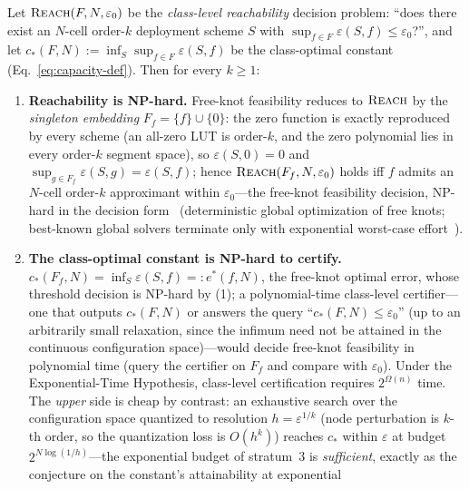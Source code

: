 \vspace{4pt}
\begin{theorem}
\label{thm:stratum3-transfer}
Let $\textsc{Reach}(F, N, \varepsilon_0)$ be the \emph{class-level
reachability} decision problem: ``does there exist an $N$-cell
order-$k$ deployment scheme $S$ with $\sup_{f \in F} \varepsilon(S, f)
\leq \varepsilon_0$?'', and let $c_*(F, N) := \inf_S \sup_{f \in F}
\varepsilon(S, f)$ be the class-optimal constant
(Eq.~\eqref{eq:capacity-def}). Then for every $k \geq 1$:
\begin{enumerate}
    \item \textbf{Reachability is NP-hard.} Free-knot feasibility
    reduces to $\textsc{Reach}$ by the \emph{singleton embedding}
    $F_f = \{f\} \cup \{0\}$: the zero function is exactly reproduced
    by every scheme (an all-zero LUT is order-$k$, and the zero
    polynomial lies in every order-$k$ segment space), so
    $\varepsilon(S, 0) = 0$ and $\sup_{g \in F_f} \varepsilon(S, g) =
    \varepsilon(S, f)$; hence $\textsc{Reach}(F_f, N, \varepsilon_0)$
    holds iff $f$ admits an $N$-cell order-$k$ approximant within
    $\varepsilon_0$---the free-knot feasibility decision, NP-hard in
    the decision form~\cite{beliakov2004least} (deterministic global
    optimization of free knots; best-known global solvers terminate
    only with exponential worst-case effort~\cite{mohr2023globally}).
    \item \textbf{The class-optimal constant is NP-hard to certify.}
    $c_*(F_f, N) = \inf_S \varepsilon(S, f) =: e^*(f, N)$, the
    free-knot optimal error, whose threshold decision is NP-hard by
    (1); a polynomial-time class-level certifier---one that outputs
    $c_*(F, N)$ or answers the query ``$c_*(F, N) \leq \varepsilon_0$''
    (up to an arbitrarily small relaxation, since the infimum need not
    be attained in the continuous configuration space)---would decide
    free-knot feasibility in polynomial time (query the certifier on
    $F_f$ and compare with $\varepsilon_0$). Under the
    Exponential-Time Hypothesis, class-level certification requires
    $2^{\Omega(n)}$ time. The \emph{upper} side is cheap by
    contrast: an exhaustive search over the configuration space
    quantized to resolution $h = \varepsilon^{1/k}$ (node perturbation
    is $k$-th order, so the quantization loss is $O(h^k)$) reaches
    $c_*$ within $\varepsilon$ at budget $2^{N \log(1/h)}$---the
    exponential budget of stratum~3 is \emph{sufficient}, exactly as
    the conjecture on the constant's attainability at exponential

\end{enumerate}
\end{theorem}
